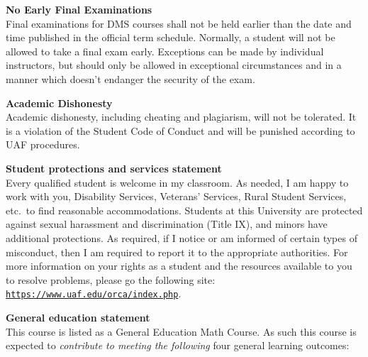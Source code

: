 \documentclass[12pt]{article}
\renewcommand{\emph}[1]{\textsf{\textbf{#1}}}
\newcommand{\localhead}[1]{\par\smallskip\textbf{#1} \smallskip\nobreak\\}%
\def\subheading#1{\localhead{\emph{#1}}}
\begin{document}
\subheading{No Early Final Examinations}
Final examinations for DMS
  courses shall not be held earlier than the date and time published
  in the official term schedule. Normally, a student will not be
  allowed to take a final exam early. Exceptions can be made by
  individual instructors, but should only be allowed in exceptional
  circumstances and in a manner which doesn't endanger the security of
  the exam.

\subheading{Academic Dishonesty}
Academic dishonesty, including cheating and plagiarism, will not
be tolerated.  It is a violation of the Student Code of Conduct
and will be punished according to UAF procedures.


\subheading{Student protections and services statement}
Every qualified student is welcome in my classroom.  As needed, I am happy to work with you, Disability Services, Veterans' Services, Rural Student Services, etc.~to find reasonable accommodations.  Students at this University are protected against sexual harassment and discrimination (Title IX), and minors have additional protections.  As required, if I notice or am informed of certain types of misconduct, then I am required to report it to the appropriate authorities.  For more information on your rights as a student and the resources available to you to resolve problems, please go the following site: \href{https://www.uaf.edu/orca/index.php}{\texttt{https://www.uaf.edu/orca/index.php}}.


\strut

\vspace{-12pt}

\subheading{General education statement}
This course is listed as a General Education Math Course.  As such this course is expected to \textsl{contribute to meeting the following} four general learning outcomes:
\end{document}
